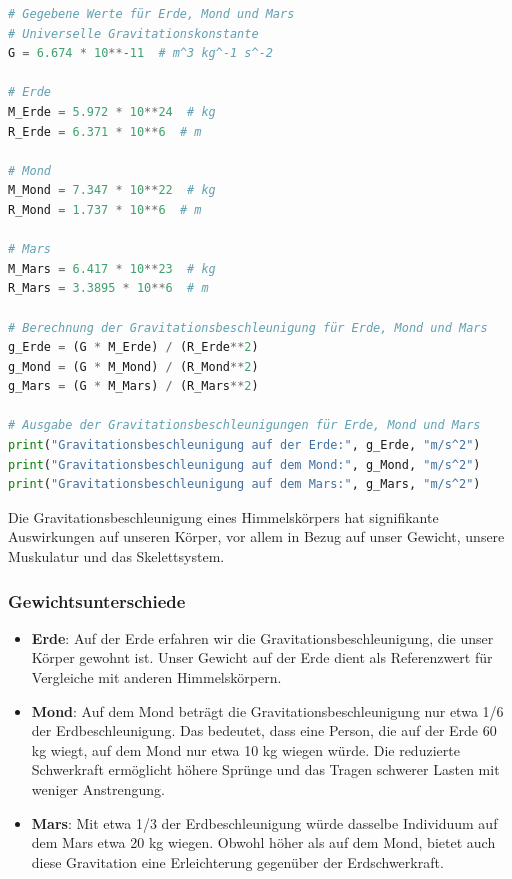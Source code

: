 \documentclass{vorlage-design-main}
\begin{document}
\begin{lstlisting}[language=Python]
# Gegebene Werte für Erde, Mond und Mars
# Universelle Gravitationskonstante
G = 6.674 * 10**-11  # m^3 kg^-1 s^-2

# Erde
M_Erde = 5.972 * 10**24  # kg
R_Erde = 6.371 * 10**6  # m

# Mond
M_Mond = 7.347 * 10**22  # kg
R_Mond = 1.737 * 10**6  # m

# Mars
M_Mars = 6.417 * 10**23  # kg
R_Mars = 3.3895 * 10**6  # m

# Berechnung der Gravitationsbeschleunigung für Erde, Mond und Mars
g_Erde = (G * M_Erde) / (R_Erde**2)
g_Mond = (G * M_Mond) / (R_Mond**2)
g_Mars = (G * M_Mars) / (R_Mars**2)

# Ausgabe der Gravitationsbeschleunigungen für Erde, Mond und Mars
print("Gravitationsbeschleunigung auf der Erde:", g_Erde, "m/s^2")
print("Gravitationsbeschleunigung auf dem Mond:", g_Mond, "m/s^2")
print("Gravitationsbeschleunigung auf dem Mars:", g_Mars, "m/s^2")
\end{lstlisting}

Die Gravitationsbeschleunigung eines Himmelskörpers hat signifikante
Auswirkungen auf unseren Körper, vor allem in Bezug auf unser Gewicht,
unsere Muskulatur und das Skelettsystem.

\hypertarget{gewichtsunterschiede}{%
\subsubsection{Gewichtsunterschiede}\label{gewichtsunterschiede}}

\begin{itemize}

\item
  \textbf{Erde}: Auf der Erde erfahren wir die
  Gravitationsbeschleunigung, die unser Körper gewohnt ist. Unser
  Gewicht auf der Erde dient als Referenzwert für Vergleiche mit anderen
  Himmelskörpern.
\item
  \textbf{Mond}: Auf dem Mond beträgt die Gravitationsbeschleunigung nur
  etwa 1/6 der Erdbeschleunigung. Das bedeutet, dass eine Person, die
  auf der Erde 60 kg wiegt, auf dem Mond nur etwa 10 kg wiegen würde.
  Die reduzierte Schwerkraft ermöglicht höhere Sprünge und das Tragen
  schwerer Lasten mit weniger Anstrengung.
\item
  \textbf{Mars}: Mit etwa 1/3 der Erdbeschleunigung würde dasselbe
  Individuum auf dem Mars etwa 20 kg wiegen. Obwohl höher als auf dem
  Mond, bietet auch diese Gravitation eine Erleichterung gegenüber der
  Erdschwerkraft.
\end{itemize}
\end{document}
